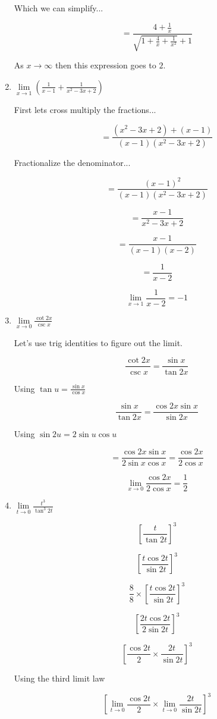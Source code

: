 \documentclass{article}
\begin{document}
\begin{enumerate}
			Which we can simplify...

			$$ = \frac{ 4 + \frac{1}{x} }{ \sqrt{1 + \frac{4}{x} + \frac{1}{x^2}} + 1}$$

			As $x \to \infty$ then this expression goes to $2$.

		\item $\lim \limits _{x \to 1} (\frac{1}{x-1} + \frac{1}{x^2 - 3x + 2})$

			First lets cross multiply the fractions...

			$$ = \frac{ (x^2 - 3x + 2) + (x - 1)}{(x-1)(x^2 - 3x + 2)}$$

			Fractionalize the denominator...

			$$ = \frac{(x-1)^2}{(x-1)(x^2 - 3x + 2)}$$

			$$ = \frac{x-1}{x^2 - 3x + 2}$$

			$$ = \frac{x-1}{(x-1)(x-2)}$$

			$$ = \frac{1}{x-2}$$

			$$\lim \limits _{x \to 1} \frac{1}{x-2} = -1$$

		\item $\lim \limits _{x \to 0} \frac{\cot 2x}{\csc x}$

		Let's use trig identities to figure out the limit.

		$$\frac{\cot 2x}{\csc x} = \frac{\sin x}{\tan 2x}$$

		Using $\tan u = \frac{\sin x}{\cos x}$

		$$\frac{\sin x}{\tan 2x} = \frac{\cos 2x \sin x}{\sin 2x}$$

		Using $\sin 2u = 2 \sin u \cos u$

		$$ = \frac{\cos 2x \sin x}{ 2 \sin x \cos x} = \frac{\cos 2x}{2 \cos x}$$

		$$\lim \limits _{x \to 0} \frac{\cos 2x}{2 \cos x} = \frac{1}{2}$$

		\item $\lim \limits _{t \to 0} \frac{t^3}{\tan ^{3} 2t}$

			$$ [\frac{t}{\tan 2t}]^3$$

			$$ [\frac{t \cos 2t}{\sin 2t} ]^3 $$

			$$\frac{8}{8} \times [\frac{t \cos 2t}{\sin 2t} ]^3$$

			$$[\frac{2t \cos 2t}{2 \sin 2t}]^3$$

			$$[\frac{\cos 2t}{2} \times \frac{2t}{\sin 2t}]^3$$

			Using the third limit law

			$$[ \lim \limits _{t \to 0} \frac{\cos 2t}{2} \times \lim \limits _{t \to 0} \frac{2t}{\sin 2t}]^3$$


\end{enumerate}
\end{document}
